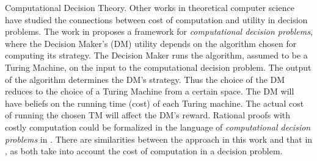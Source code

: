 \medskip
\noindent
{\sc Computational Decision Theory.}
Other works in theoretical computer science have studied the connections between cost of computation and utility in decision problems.
The work in \cite{halpern2011don} proposes a framework for \emph{computational decision problems}, where the Decision Maker's (DM) utility depends on the algorithm chosen for computing its strategy.
The Decision Maker runs the algorithm, assumed to be a Turing Machine, on the input to the computational decision problem.
The output of the algorithm determines the DM's strategy. 
Thus the choice of the DM reduces to the choice of a Turing Machine from a certain space. The DM will have beliefs on the running time (cost) of each Turing machine. The actual cost of running the chosen TM will affect the DM's reward.
Rational proofs with costly computation could be formalized in the language of \emph{computational decision problems} in \cite{halpern2011don}. There are similarities between the approach in this
work and that in \cite{halpern2011don}, as both take into account the cost of computation in a decision problem.





